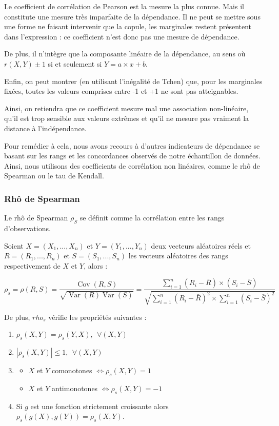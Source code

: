 Le coefficient de corrélation de Pearson est la mesure la plus connue. Mais il constitute une mesure très imparfaite de la dépendance. Il ne
peut se mettre sous une forme ne faisant intervenir que la copule, les marginales restent présentent dans l’expression : ce coefficient n’est donc
pas une mesure de dépendance.

De plus, il n’intègre que la composante linéaire de la dépendance, au sens où $r(X,Y) \pm 1$ si et seulement si $Y= a \times x + b$.

Enfin, on peut montrer (en utilisant l'inégalité de Tchen) que, pour les marginales fixées, toutes les valeurs
comprises entre -1 et +1 ne sont pas atteignables.

Ainsi, on retiendra que ce coefficient mesure mal une association non-linéaire, qu'il est trop sensible aux valeurs extrêmes et qu'il ne mesure pas vraiment la distance à l'indépendance.

Pour remédier à cela, nous avons recours à d’autres indicateurs de dépendance se basant sur les rangs et les concordances observés de notre échantillon de données. 
Ainsi, nous utilisons des coefficients de corrélation non linéaires, comme le rhô de Spearman ou le tau de Kendall.

\subsubsection{Rhô de Spearman}

Le rhô de Spearman $\rho_S$ se définit comme la corrélation entre les rangs d'observations.

Soient $X=(X_1,...,X_n)$ et $Y=(Y_1,...,Y_n)$ deux vecteurs aléatoires réels et $R = (R_1,...,R_n)$ et $S = (S_1,...,S_n)$ les vecteurs aléatoires des rangs respectivement
de $X$ et $Y$, alors :

$$
\rho_s = \rho(R,S) = \frac{\operatorname{Cov}(R,S)}{\sqrt{ \operatorname{Var}(R) \operatorname{Var}(S)}} = \frac{ \sum_{i=1}^n (R_i - \bar{R}) \times (S_i - \bar{S})  }{ \sqrt{   \sum_{i=1}^n (R_i - \bar{R})^2 \times  \sum_{i=1}^n (S_i - \bar{S})^2    }    }
$$

De plus, $rho_s$ vérifie les propriétés suivantes :

\begin{enumerate}

\item $\rho_s(X,Y) = \rho_s(Y,X), ~~\forall (X,Y)$
\item $|\rho_s(X,Y)| \leq 1, ~~\forall (X,Y)$
\item 
\begin{itemize}
\item $X$ et $Y$ comonotones $\Longleftrightarrow \rho_s(X,Y)=1$
\item $X$ et $Y$ antimonotones $\Longleftrightarrow \rho_s(X,Y)=-1$
\end{itemize}
\item Si $g$ est une fonction strictement croissante alors $\rho_s(g(X),g(Y))=\rho_s(X,Y)$.

\end{enumerate}

